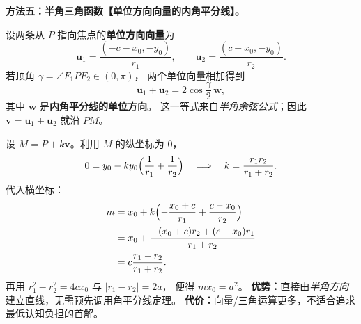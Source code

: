 \begin{proofbox}
\textbf{方法五：半角三角函数【单位方向向量的内角平分线】。}


设两条从 $P$ 指向焦点的\textbf{单位方向向量}为
\[
\boldsymbol{u}_1=\frac{(-c-x_0,-y_0)}{r_1},
\qquad
\boldsymbol{u}_2=\frac{(c-x_0,-y_0)}{r_2}.
\]
若顶角 $\gamma=\angle F_1PF_2\in(0,\pi)$，
两个单位向量相加得到
\[
\boldsymbol{u}_1+\boldsymbol{u}_2
=2\cos\frac{\gamma}{2}\,\boldsymbol{w},
\]
其中 $\boldsymbol{w}$ 是\textbf{内角平分线的单位方向}。
这一等式来自\emph{半角余弦公式}；因此
$\boldsymbol{v}=\boldsymbol{u}_1+\boldsymbol{u}_2$ 就沿 $PM$。

设 $M=P+k\boldsymbol v$。利用 $M$ 的纵坐标为 $0$，
\[
0=y_0-k y_0\Bigl(\frac1{r_1}+\frac1{r_2}\Bigr)
\quad\Longrightarrow\quad
k=\frac{r_1r_2}{r_1+r_2}.
\]
代入横坐标：
\[
\begin{aligned}
m
&=x_0+k\Bigl(-\frac{x_0+c}{r_1}+\frac{c-x_0}{r_2}\Bigr)\\
&=x_0+\frac{-(x_0+c)r_2+(c-x_0)r_1}{r_1+r_2}\\
&=c\frac{r_1-r_2}{r_1+r_2}.
\end{aligned}
\]
再用 $r_1^2-r_2^2=4cx_0$ 与 $|r_1-r_2|=2a$，
便得 $mx_0=a^2$。
\textbf{优势：}直接由\emph{半角方向}建立直线，无需预先调用角平分线定理。
\textbf{代价：}向量/三角运算更多，不适合追求最低认知负担的首解。

\medskip
\end{proofbox}


